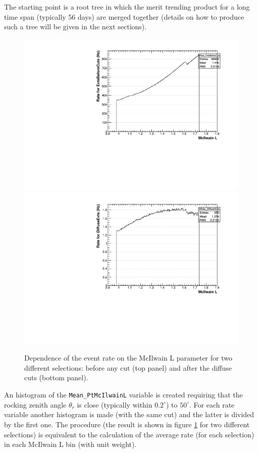 \documentclass[a4paper,twocolumn]{article}
\begin{document}
The starting point is a root tree in which the merit trending product for a
long time span (typically 56 days) are merged together (details on how to
produce such a tree will be given in the next sections).
\begin{figure}[htb!]
  \begin{center}
    \includegraphics[width=\linewidth]{figures/EvtsBeforeCuts_mcIlwainL}\\
    \includegraphics[width=\linewidth]{figures/DiffuseEvts_mcIlwainL}
    \caption{Dependence of the event rate on the McIlwain L parameter for
      two different selections: before any cut (top panel) and after the
      diffuse cuts (bottom panel).}
    \label{mcIlwainL}
  \end{center}
\end{figure}
An histogram of the \texttt{Mean\_PtMcIlwainL} variable
is created requiring that the rocking zenith angle $\theta_r$ is close
(typically within $0.2^\circ$) to $50^\circ$. For each rate variable 
another histogram is made (with the same cut) and the latter is divided by the
first one. The procedure (the result is shown in figure \ref{mcIlwainL} for
two different selections) is equivalent to the calculation of the average rate 
(for each selection) in each McIlwain L bin (with unit weight).
\end{document}
